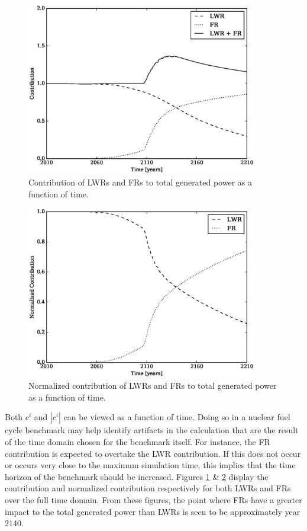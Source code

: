 \begin{figure}[htb]
\centering
\includegraphics[width=0.9\textwidth]{c-of-t.eps}
\caption{Contribution of LWRs and FRs to total generated power as a 
function of time.}
\label{c-of-t}
\end{figure}

\begin{figure}[htb]
\centering
\includegraphics[width=0.9\textwidth]{normc-of-t.eps}
\caption{Normalized contribution of LWRs and FRs to total generated power 
as a function of time.}
\label{normc-of-t}
\end{figure}

Both $c^i$ and $|c^i|$ can be viewed as a function of time.
Doing so in a nuclear fuel cycle benchmark may help identify artifacts in the
calculation that are the result of the time domain chosen for the benchmark itself.
For instance, the FR contribution is expected to overtake the LWR contribution.
If this does not occur or occurs very close to the maximum simulation time, 
this implies that the time horizon of the benchmark should be increased.
Figures \ref{c-of-t} \& \ref{normc-of-t} display the contribution and 
normalized contribution respectively for both LWRs and FRs over the full 
time domain. From these figures, the point where FRs have a greater impact
to the total generated power
than LWRs is seen to be approximately year 2140.

